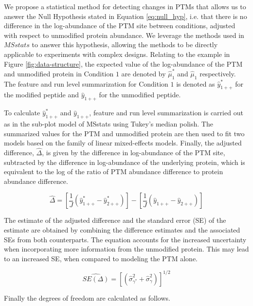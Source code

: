 \documentclass[mcp]{article}
\numberwithin{table}{section}
\begin{document}
We propose a statistical method for detecting changes in PTMs that allows us to answer the Null Hypothesis stated in Equation \ref{eq:null_hyp}, i.e. that there is no difference in the log-abundance of the PTM site between conditions, adjusted with respect to unmodified protein abundance. We leverage the methods used in $MSstats$ to answer this hypothesis, allowing the methods to be directly applicable to experiments with complex designs. Relating to the example in Figure \ref{fig:data-structure}, the expected value of the log-abundance of the PTM and unmodified protein in Condition $1$ are denoted by $\hat{\mu}_{1}^{\ast}$ and $\hat{\mu}_{1}$ respectively. The feature and run level summarization for Condition $1$ is denoted as $\hat{y}_{1++}^{\ast}$ for the modified peptide and $\hat{y}_{1++}$ for the unmodified peptide. 

To calculate $\hat{y}_{1++}^{\ast}$ and $\hat{y}_{1++}$, feature and run level summarization is carried out as in the sub-plot model of MSstats using Tukey's median polish. The summarized values for the PTM and unmodified protein are then used to fit two models based on the family of linear mixed-effects models. Finally, the adjusted difference, $\hat{\Delta}$, is given by the difference in log-abundance of the PTM site, subtracted by the difference in log-abundance of the underlying protein, which is equivalent to the log of the ratio of PTM abundance difference to protein abundance difference.

\begin{equation}
\hat{\Delta} = \left[ \frac{1}{J} \left( \hat{y}_{1++}^{\ast} - \hat{y}_{2++}^{\ast} \right) \right] - \left[ \frac{1}{J} \left( \hat{y}_{1++} - \hat{y}_{2++} \right) \right]
\label{eq:prop_fc}
\end{equation}

The estimate of the adjusted difference and the standard error (SE) of the estimate are obtained by combining the difference estimates and the associated SEs from both counterparts. The equation accounts for the increased uncertainty when incorporating more information from the unmodified protein. This may lead to an increased SE, when compared to modeling the PTM alone.

\begin{equation}
\widehat{SE(\Delta)} = \left[ \left( \hat{\sigma}_{\gamma^{\ast}}^{2} + \hat{\sigma}_{\gamma}^{2} \right) \right]^{1/2}
\label{eq:prop_se}
\end{equation}

Finally the degrees of freedom are calculated as follows.
\end{document}
